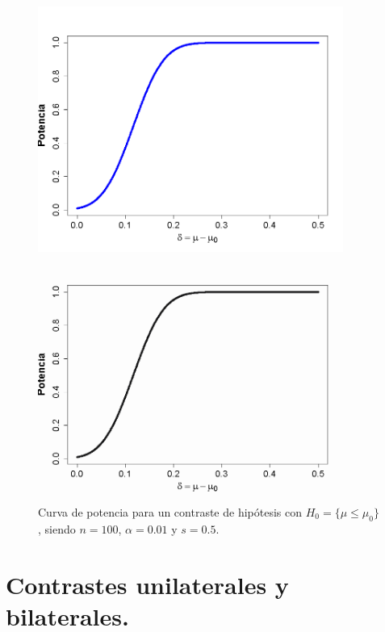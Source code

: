 \begin{figure}[htb]
\begin{center}
\begin{enColor}
\includegraphics[width=10cm]{../fig/Cap07-CurvaPotencia.png}
\end{enColor}
\begin{bn}
\includegraphics[width=10cm]{../fig/Cap07-CurvaPotencia-bn.png}
\end{bn}
\caption{Curva de potencia para un contraste de hipótesis con $H_0=\{\mu\leq \mu_0\}$, siendo $n=100$, $\alpha=0.01$ y $s=0.5$.}
\label{cap07:fig:CurvaPotencia}
\end{center}
\end{figure}



\section{Contrastes unilaterales y bilaterales.}
\label{cap07:sec:ContrastesUnilateralesBilaterales}

